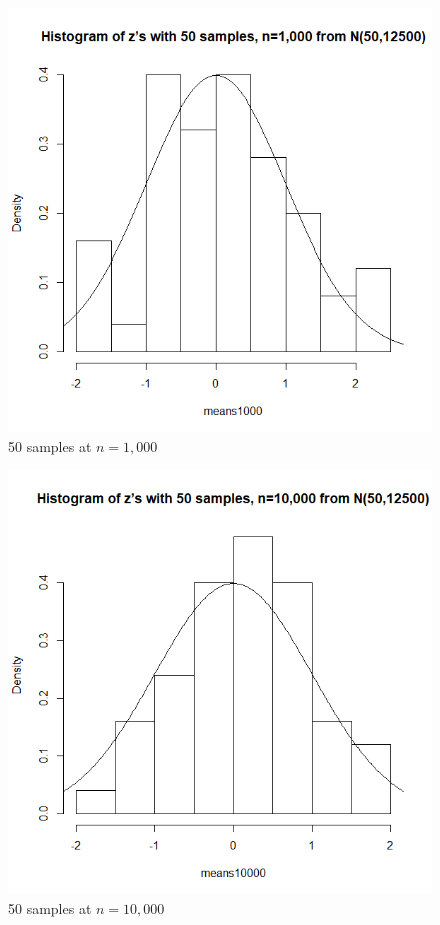 \documentclass[12pt]{article}
\begin{document}
\begin{figure}[H]
	\centering
	\includegraphics{img/Problem6_1.png}
	\caption{50 samples at $n = 1,000$}
\end{figure}

\begin{figure}[H]
	\centering
	\includegraphics{img/Problem6_2.png}
	\caption{50 samples at $n=10,000$}
\end{figure}
\end{document}
